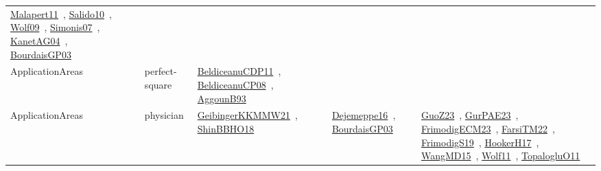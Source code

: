 {\begin{longtable}{lp{3cm}>{\raggedright\arraybackslash}p{6cm}>{\raggedright\arraybackslash}p{6cm}>{\raggedright\arraybackslash}p{8cm}}
\href{../works/Malapert11.pdf}{Malapert11}~\cite{Malapert11}, \href{../works/Salido10.pdf}{Salido10}~\cite{Salido10}, \href{../works/Wolf09.pdf}{Wolf09}~\cite{Wolf09}, \href{../works/Simonis07.pdf}{Simonis07}~\cite{Simonis07}, \href{../works/KanetAG04.pdf}{KanetAG04}~\cite{KanetAG04}, \href{../works/BourdaisGP03.pdf}{BourdaisGP03}~\cite{BourdaisGP03}\\
\index{perfect-square}\index{ApplicationAreas!perfect-square}ApplicationAreas & perfect-square & \href{../works/BeldiceanuCDP11.pdf}{BeldiceanuCDP11}~\cite{BeldiceanuCDP11}, \href{../works/BeldiceanuCP08.pdf}{BeldiceanuCP08}~\cite{BeldiceanuCP08}, \href{../works/AggounB93.pdf}{AggounB93}~\cite{AggounB93} &  & \\
\index{physician}\index{ApplicationAreas!physician}ApplicationAreas & physician & \href{../works/GeibingerKKMMW21.pdf}{GeibingerKKMMW21}~\cite{GeibingerKKMMW21}, \href{../works/ShinBBHO18.pdf}{ShinBBHO18}~\cite{ShinBBHO18} & \href{../works/Dejemeppe16.pdf}{Dejemeppe16}~\cite{Dejemeppe16}, \href{../works/BourdaisGP03.pdf}{BourdaisGP03}~\cite{BourdaisGP03} & \href{../works/GuoZ23.pdf}{GuoZ23}~\cite{GuoZ23}, \href{../works/GurPAE23.pdf}{GurPAE23}~\cite{GurPAE23}, \href{../works/FrimodigECM23.pdf}{FrimodigECM23}~\cite{FrimodigECM23}, \href{../works/FarsiTM22.pdf}{FarsiTM22}~\cite{FarsiTM22}, \href{../works/FrimodigS19.pdf}{FrimodigS19}~\cite{FrimodigS19}, \href{../works/HookerH17.pdf}{HookerH17}~\cite{HookerH17}, \href{../works/WangMD15.pdf}{WangMD15}~\cite{WangMD15}, \href{../works/Wolf11.pdf}{Wolf11}~\cite{Wolf11}, \href{../works/TopalogluO11.pdf}{TopalogluO11}~\cite{TopalogluO11}\\

\end{longtable}}
